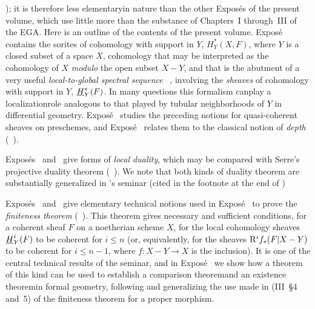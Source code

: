 ); it is therefore less
\og elementary\fg in nature than the other Expos\'es of the present
volume, which use little more than the substance of Chapters~I through~III
of the EGA. Here is an outline of the contents of the present volume.
Expos\'e~ contains the sorites of \og cohomology with support in
$Y$\fg, $H_Y^*(X,F)$, where $Y$ is a closed subset of a space $X$,
cohomology that may be interpreted as the cohomology of $X$ \emph{modulo}
the open subset $X-Y$, and that is the abutment of a very useful
\og \emph{local-to-global spectral sequence}\fg
{}~, involving the \emph{sheaves} of cohomology
\og with support in $Y$\fg, $\underline{H}_Y^*(F)$. In many questions this
formalism can\pageoriginale play a \og localization\fg role analogous to
that played by tubular neighborhoods of $Y$ in differential geometry.
Expos\'e~ studies the preceding notions for quasi-coherent sheaves
on preschemes, and Expos\'e~ relates them to the classical notion
of \emph{depth} (~).

Expos\'es~ and~ give forms of \emph{local duality}, which
may be compared with Serre's projective duality theorem
(~). We note that both kinds of duality theorem are
substantially generalized in 's seminar
(cited in the footnote at the end of \Exp {})

Expos\'es~ and~ give elementary technical notions used in
Expos\'e~ to prove the \emph{finiteness theorem}
(~). This theorem gives necessary and sufficient
conditions, for a coherent sheaf $F$ on a noetherian scheme $X$, for the
local cohomology sheaves $\underline{H}_Y^i(F)$ to be coherent for $i\leq n$
(or, equivalently, for the sheaves $\mathrm R^if_*(F|X-Y)$ to be coherent for
$i\leq n-1$, where $f\colon X-Y\to X$ is the inclusion). It is one of the
central technical results of the seminar, and in Expos\'e~ we show
how a theorem of this kind can be used to establish a \og comparison
theorem\fg and an \og existence theorem\fg in formal geometry, following
and generalizing the use made in (\EGA III~\oldS\S 4 and~5) of the
finiteness theorem for a proper morphism.

